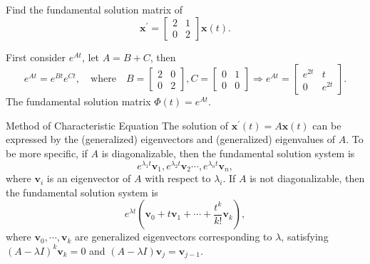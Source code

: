 \begin{example}{}{}
  Find the fundamental solution matrix of
  \begin{equation}
    \mathbf{x}^{\prime} =
    \begin{bmatrix}
      2 & 1\\
      0 & 2
    \end{bmatrix} \mathbf{x}(t).
  \end{equation}
\end{example}

\begin{solution}
  First consider $e^{At}$, let $A = B + C$, then
  \begin{equation}
    e^{At} = e^{Bt}e^{Ct}, \quad
    \text{where} \quad
    B =
    \begin{bmatrix}
      2 & 0\\
      0 & 2
    \end{bmatrix}, C =
    \begin{bmatrix}
      0 & 1\\
      0 & 0
    \end{bmatrix}
    \Rightarrow e^{At} =
    \begin{bmatrix}
      e^{2t} & t\\
      0 & e^{2t}
    \end{bmatrix}.
  \end{equation}
  The fundamental solution matrix $\Phi(t) = e^{At}$.
\end{solution}

\begin{proposition}{Method of Characteristic Equation}{}
  The solution of $\mathbf{x}^{\prime}(t) = A \mathbf{x}(t)$ can be expressed
  by the (generalized) eigenvectors and (generalized) eigenvalues of $A$.
  To be more specific, if $A$ is diagonalizable, then the fundamental solution system is
  \begin{equation}
    e^{\lambda_1 t}\mathbf{v}_1, e^{\lambda_2 t}\mathbf{v}_2 \cdots, e^{\lambda_n t}\mathbf{v}_n,
  \end{equation}
  where $\mathbf{v}_i$ is an eigenvector of $A$ with respect to $\lambda_i$.
  If $A$ is not diagonalizable, then the fundamental solution system is
  \begin{equation}
    e^{\lambda t} \left( \mathbf{v}_0 + t\mathbf{v}_1 + \cdots + \frac{t^k}{k!}\mathbf{v}_k \right),
  \end{equation}
  where $\mathbf{v}_0, \cdots, \mathbf{v}_k$ are generalized eigenvectors corresponding to $\lambda$,
  satisfying $(A - \lambda I)^k \mathbf{v}_k = 0$ and $(A - \lambda I)\mathbf{v}_j = \mathbf{v}_{j-1}$.
\end{proposition}

